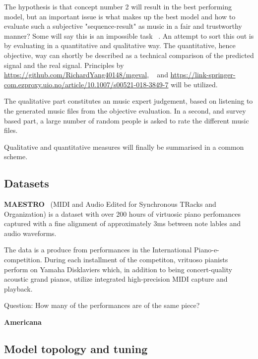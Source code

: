 \documentclass{article}
\begin{document}
        The hypothesis is that concept number 2 will result in the best performing model,
        but an important issue is what makes up the best model and how to evaluate such a
        subjective "sequence-result" as music in a fair and trustworthy manner?
        Some will say this is an impossible task ~\cite{1030094}.
        An attempt to sort this out is by evaluating in a quantitative and qualitative way.
        The quantitative, hence objective, way can shortly be described as a technical
        comparison of the predicted signal and the real signal. Principles by
        \url{https://github.com/RichardYang40148/mgeval}, ~\cite{wu2020jazz} and
        \url{https://link-springer-com.ezproxy.uio.no/article/10.1007/s00521-018-3849-7} will be utilized.
        
        The qualitative part constitutes an music expert judgement,
        based on listening to the generated music files from the objective evaluation.
        In a second, and survey based part, a large number of random people is asked
        to rate the different music files.
        
        Qualitative and quantitative measures will finally be summarised in a common scheme.
        
    \subsection{Datasets}

    \textbf{MAESTRO}~\cite{maestrodataset}
    (MIDI and Audio Edited for Synchronous TRacks and Organization)
    is a dataset with over 200 hours of virtuosic piano perfomances captured with 
    a fine alignment of approximately 3ms between note lables and audio waveforms.

    The data is a produce from performances in the International Piano-e-competition.
    During each installment of the competiton, vrituoso pianists perform on Yamaha
    Disklaviers which, in addition to being concert-quality acoustic grand pianos,
    utilize integrated high-precision MIDI capture and playback.

    Question: How many of the performances are of the same piece?

    \textbf{Americana}
    
    \subsection{Model topology and tuning}
    
\end{document}
